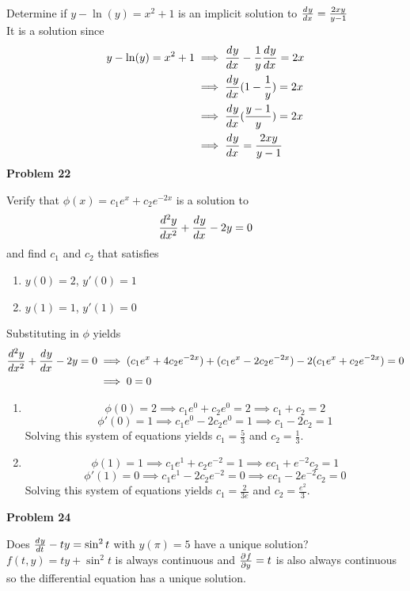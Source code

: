 Determine if $y-\ln(y) = x^2+1$ is an implicit solution to 
$\der{y}{x} = \frac{2xy}{y-1}$ \\
\solution 
It is a solution since
\begin{align*}
    y-\ln(y) = x^2+1
    &\implies \der{y}{x} - \frac{1}{y}\der{y}{x} = 2x \\
    &\implies \der{y}{x} (1-\frac{1}{y}) = 2x \\ 
    &\implies \der{y}{x} (\frac{y-1}{y}) = 2x \\ 
    &\implies \der{y}{x} = \frac{2xy}{y-1}
\end{align*}
\textbf{Problem 22}

Verify that $\phi(x) = c_1e^x + c_2e^{-2x}$
is a solution to 
\[
    \der[2]{y}{x} + \der{y}{x} - 2y = 0
\]
and find $c_1$ and $c_2$ that satisfies
\begin{enumerate}
    \item $y(0) = 2$, $y'(0) = 1$
    \item $y(1) = 1$, $y'(1) = 0$
\end{enumerate} 
\solution 
Substituting in $\phi$ yields 
\begin{align*}
    \der[2]{y}{x} + \der{y}{x} - 2y = 0
    &\implies (c_1e^x + 4c_2e^{-2x}) + (c_1e^x - 2c_2e^{-2x}) - 2(c_1e^x + c_2e^{-2x}) = 0 \\
    &\implies 0 = 0
\end{align*}
\begin{enumerate}
    \item 
        \[
            \phi(0) = 2 
            \implies c_1e^0 + c_2e^0 = 2
            \implies c_1 + c_2 = 2
        \]
        \[
            \phi'(0) = 1
            \implies c_1e^0 - 2c_2e^0 = 1
            \implies c_1 - 2c_2 = 1
        \]
        Solving this system of equations yields 
        $c_1 = \frac{5}{3}$ and $c_2 = \frac{1}{3}$.
    \item 
        \[
            \phi(1) = 1
            \implies c_1e^1 + c_2e^{-2} = 1
            \implies ec_1 + e^{-2}c_2 = 1
        \]
        \[
            \phi'(1) = 0
            \implies c_1e^1 - 2c_2e^{-2} = 0
            \implies ec_1 - 2 e^{-2}c_2 = 0
        \]
        Solving this system of equations yields 
        $c_1 = \frac{2}{3e}$ and $c_2 = \frac{e^2}{3}$.
\end{enumerate}
\textbf{Problem 24}

Does $\der{y}{t} - ty = \sin^2 t$ with $y(\pi)=5$
have a unique solution? \\
\solution
$f(t,y) = ty + \sin^2 t$ is always continuous and 
$\pder{f}{y} = t$ is also always continuous so 
the differential equation has a unique solution.

